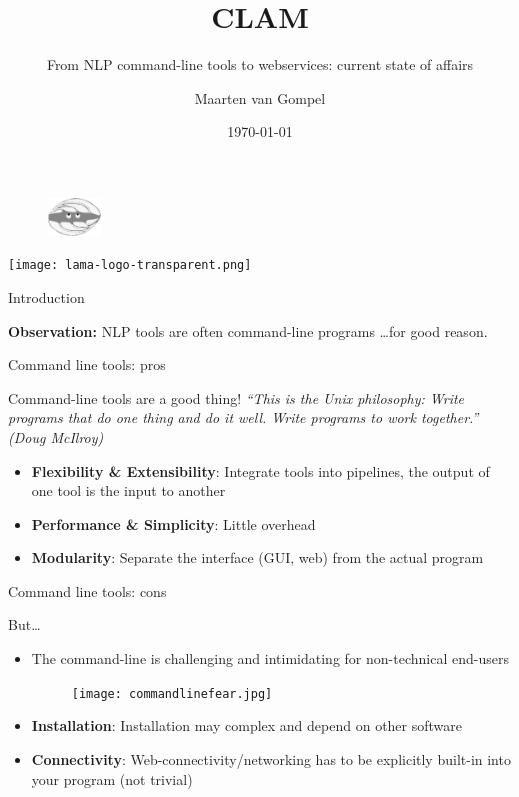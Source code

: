 \documentclass[xcolor=table,10pt,t]{beamer}
\title{CLAM}
\subtitle{From NLP command-line tools to webservices: current state of affairs}
\date{\today}
\author{Maarten van Gompel}
\begin{document}
\begin{frame}
  \titlepage
        \begin{figure}
          \includegraphics[height=1cm]{clamup_bw.png}
        \end{figure}
        \vspace{3.5cm}
      \texttt{[image: lama-logo-transparent.png]}
\end{frame}



\begin{frame}{Introduction}
  \begin{block}{}
    \textbf{Observation:} NLP tools are often command-line programs \ldots for
    good reason.
  \end{block}
\end{frame}



\begin{frame}{Command line tools: pros}
  \begin{block}{Command-line tools are a good thing!}
      \emph{``This is the Unix philosophy: Write programs that do one thing and do
      it well. Write programs to work together.'' (Doug McIlroy)}

      \medskip

      \begin{itemize}
        \item \textbf{Flexibility \& Extensibility}: Integrate tools into pipelines, the output of one tool is the input to another
        \item \textbf{Performance \& Simplicity}: Little overhead
        \item \textbf{Modularity}: Separate the interface (GUI, web) from the actual program
      \end{itemize}

  \end{block}

\end{frame}


\begin{frame}{Command line tools: cons}
  \begin{block}{But\ldots}
      \begin{itemize}
        \item The command-line is challenging and intimidating for non-technical end-users
        \begin{figure}
            \texttt{[image: commandlinefear.jpg]}
        \end{figure}
        \item \textbf{Installation}: Installation may complex and depend on other software
        \item \textbf{Connectivity}: Web-connectivity/networking has to be
            explicitly built-in into your program (not trivial)
      \end{itemize}
  \end{block}
\end{frame}
\end{document}
